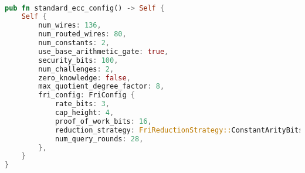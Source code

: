 
\hspace*{\fill} \\
\begin{lstlisting}[language=rust]
pub fn standard_ecc_config() -> Self {
    Self {
        num_wires: 136,
        num_routed_wires: 80,
        num_constants: 2,
        use_base_arithmetic_gate: true,
        security_bits: 100,
        num_challenges: 2,
        zero_knowledge: false,
        max_quotient_degree_factor: 8,
        fri_config: FriConfig {
            rate_bits: 3,
            cap_height: 4,
            proof_of_work_bits: 16,
            reduction_strategy: FriReductionStrategy::ConstantArityBits(4, 5),
            num_query_rounds: 28,
        },
    }
}   
\end{lstlisting}
